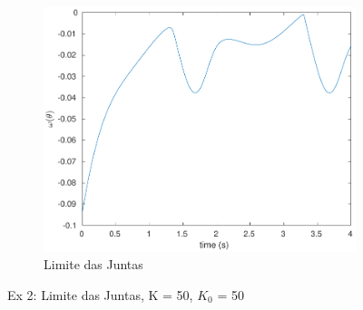 \documentclass[a4paper,11pt]{article}
\theoremstyle{mytheor}
\begin{document}
\begin{figure}[!ht]
\begin{minipage}{\linewidth}
    \begin{subfigure}[b]{0.49\textwidth}
    \includegraphics[width=1\textwidth]{figs/ex2_2b_lim_jun.pdf}
    \caption{Limite das Juntas}
    \label{fig:ex2_2b_manip}
    \end{subfigure}
  \end{minipage}
\caption{Ex 2: Limite das Juntas, K = 50, $K_0$ = 50}
\label{fig:ex2_2b}
\end{figure}
\end{document}
